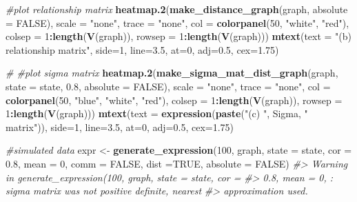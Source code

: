 \documentclass[]{article}
\newenvironment{Shaded}{\begin{snugshade}}{\end{snugshade}}
\newcommand{\CommentTok}[1]{\textcolor[rgb]{0.56,0.35,0.01}{\textit{#1}}}
\newcommand{\DataTypeTok}[1]{\textcolor[rgb]{0.13,0.29,0.53}{#1}}
\newcommand{\DecValTok}[1]{\textcolor[rgb]{0.00,0.00,0.81}{#1}}
\newcommand{\FloatTok}[1]{\textcolor[rgb]{0.00,0.00,0.81}{#1}}
\newcommand{\KeywordTok}[1]{\textcolor[rgb]{0.13,0.29,0.53}{\textbf{#1}}}
\newcommand{\NormalTok}[1]{#1}
\newcommand{\OperatorTok}[1]{\textcolor[rgb]{0.81,0.36,0.00}{\textbf{#1}}}
\newcommand{\OtherTok}[1]{\textcolor[rgb]{0.56,0.35,0.01}{#1}}
\newcommand{\StringTok}[1]{\textcolor[rgb]{0.31,0.60,0.02}{#1}}
\begin{document}
\begin{Shaded}
\begin{Highlighting}[]
\CommentTok{#plot relationship matrix}
\KeywordTok{heatmap.2}\NormalTok{(}\KeywordTok{make_distance_graph}\NormalTok{(graph, }\DataTypeTok{absolute =} \OtherTok{FALSE}\NormalTok{),}
          \DataTypeTok{scale =} \StringTok{"none"}\NormalTok{, }\DataTypeTok{trace =} \StringTok{"none"}\NormalTok{, }\DataTypeTok{col =} \KeywordTok{colorpanel}\NormalTok{(}\DecValTok{50}\NormalTok{, }\StringTok{"white"}\NormalTok{, }\StringTok{"red"}\NormalTok{),}
\DataTypeTok{colsep =} \DecValTok{1}\OperatorTok{:}\KeywordTok{length}\NormalTok{(}\KeywordTok{V}\NormalTok{(graph)), }\DataTypeTok{rowsep =} \DecValTok{1}\OperatorTok{:}\KeywordTok{length}\NormalTok{(}\KeywordTok{V}\NormalTok{(graph)))}
\KeywordTok{mtext}\NormalTok{(}\DataTypeTok{text =} \StringTok{"(b) relationship matrix"}\NormalTok{, }\DataTypeTok{side=}\DecValTok{1}\NormalTok{, }\DataTypeTok{line=}\FloatTok{3.5}\NormalTok{, }\DataTypeTok{at=}\DecValTok{0}\NormalTok{, }\DataTypeTok{adj=}\FloatTok{0.5}\NormalTok{, }\DataTypeTok{cex=}\FloatTok{1.75}\NormalTok{)}

\CommentTok{# #plot sigma matrix}
\KeywordTok{heatmap.2}\NormalTok{(}\KeywordTok{make_sigma_mat_dist_graph}\NormalTok{(graph, }\DataTypeTok{state =}\NormalTok{ state, }\FloatTok{0.8}\NormalTok{, }\DataTypeTok{absolute =} \OtherTok{FALSE}\NormalTok{),}
\DataTypeTok{scale =} \StringTok{"none"}\NormalTok{, }\DataTypeTok{trace =} \StringTok{"none"}\NormalTok{, }\DataTypeTok{col =} \KeywordTok{colorpanel}\NormalTok{(}\DecValTok{50}\NormalTok{, }\StringTok{"blue"}\NormalTok{, }\StringTok{"white"}\NormalTok{, }\StringTok{"red"}\NormalTok{),}
\DataTypeTok{colsep =} \DecValTok{1}\OperatorTok{:}\KeywordTok{length}\NormalTok{(}\KeywordTok{V}\NormalTok{(graph)), }\DataTypeTok{rowsep =} \DecValTok{1}\OperatorTok{:}\KeywordTok{length}\NormalTok{(}\KeywordTok{V}\NormalTok{(graph)))}
\KeywordTok{mtext}\NormalTok{(}\DataTypeTok{text =} \KeywordTok{expression}\NormalTok{(}\KeywordTok{paste}\NormalTok{(}\StringTok{"(c) "}\NormalTok{, Sigma, }\StringTok{" matrix"}\NormalTok{)), }\DataTypeTok{side=}\DecValTok{1}\NormalTok{, }\DataTypeTok{line=}\FloatTok{3.5}\NormalTok{, }\DataTypeTok{at=}\DecValTok{0}\NormalTok{, }\DataTypeTok{adj=}\FloatTok{0.5}\NormalTok{, }\DataTypeTok{cex=}\FloatTok{1.75}\NormalTok{)}

\CommentTok{#simulated data}
\NormalTok{expr <-}\StringTok{ }\KeywordTok{generate_expression}\NormalTok{(}\DecValTok{100}\NormalTok{, graph,  }\DataTypeTok{state =}\NormalTok{ state, }\DataTypeTok{cor =} \FloatTok{0.8}\NormalTok{, }\DataTypeTok{mean =} \DecValTok{0}\NormalTok{,}
\DataTypeTok{comm =} \OtherTok{FALSE}\NormalTok{, }\DataTypeTok{dist =}\OtherTok{TRUE}\NormalTok{, }\DataTypeTok{absolute =} \OtherTok{FALSE}\NormalTok{)}
\CommentTok{#> Warning in generate_expression(100, graph, state = state, cor =}
\CommentTok{#> 0.8, mean = 0, : sigma matrix was not positive definite, nearest}
\CommentTok{#> approximation used.}


\end{Highlighting}
\end{Shaded}
\end{document}
